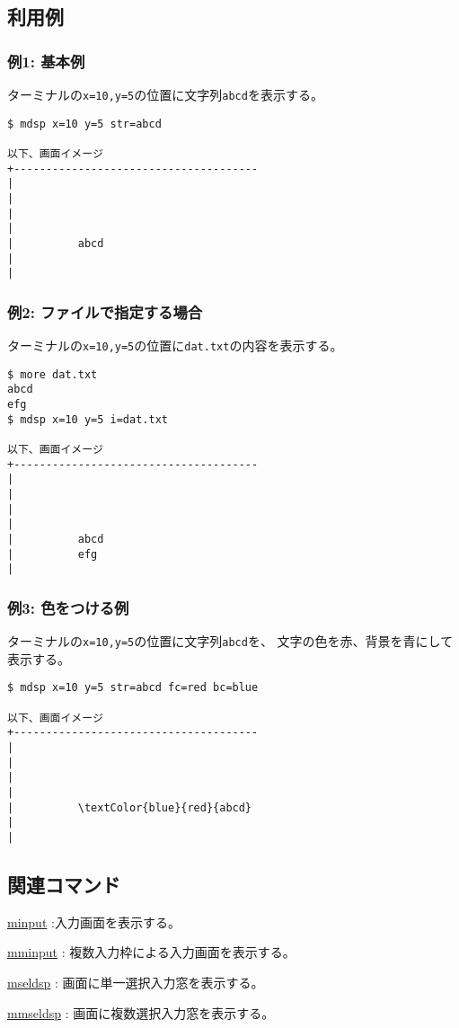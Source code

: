 \subsection*{利用例}

\subsubsection*{例1: 基本例}

ターミナルの\verb|x=10,y=5|の位置に文字列\verb|abcd|を表示する。

\begin{Verbatim}[baselinestretch=0.7,frame=single]
$ mdsp x=10 y=5 str=abcd

以下、画面イメージ
+--------------------------------------
|
|
|
|
|          abcd
|
|
\end{Verbatim}

\subsubsection*{例2: ファイルで指定する場合}

ターミナルの\verb|x=10,y=5|の位置に\verb|dat.txt|の内容を表示する。

\begin{Verbatim}[baselinestretch=0.7,frame=single]
$ more dat.txt
abcd
efg
$ mdsp x=10 y=5 i=dat.txt

以下、画面イメージ
+--------------------------------------
|
|
|
|
|          abcd
|          efg
|
\end{Verbatim}

\subsubsection*{例3: 色をつける例}

ターミナルの\verb|x=10,y=5|の位置に文字列\verb|abcd|を、
文字の色を赤、背景を青にして表示する。

\begin{Verbatim}[baselinestretch=0.7,frame=single,commandchars=\\\{\}]
$ mdsp x=10 y=5 str=abcd fc=red bc=blue

以下、画面イメージ
+--------------------------------------
|
|
|
|
|          \textColor{blue}{red}{abcd}
|
|
\end{Verbatim}

\subsection*{関連コマンド}
\hyperref[sect:minput] {minput} :入力画面を表示する。

\hyperref[sect:mminput] {mminput} : 複数入力枠による入力画面を表示する。

\hyperref[sect:mseldsp] {mseldsp} : 画面に単一選択入力窓を表示する。

\hyperref[sect:mmseldsp] {mmseldsp} : 画面に複数選択入力窓を表示する。

%
